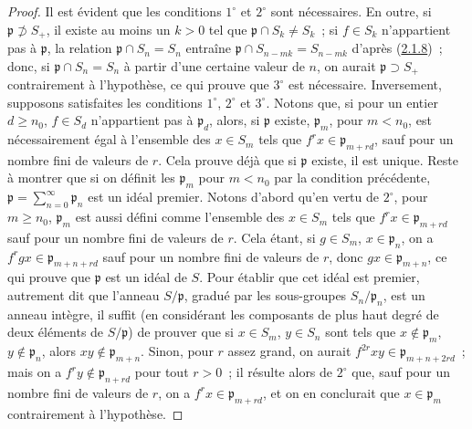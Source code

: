 \begin{proof}
Il est évident que les conditions $1^\circ$ et $2^\circ$ sont nécessaires.
En outre, si $\mathfrak{p}\not\supset S_+$, il existe au moins un $k>0$ tel que
$\mathfrak{p}\cap S_k\neq S_k$~; si $f\in S_k$ n'appartient pas à
$\mathfrak{p}$, la relation $\mathfrak{p}\cap S_n=S_n$ entraîne
$\mathfrak{p}\cap S_{n-mk}=S_{n-mk}$ d'après
(\hyperref[II.2.1.8-fr]{2.1.8})~; donc, si
$\mathfrak{p}\cap S_n=S_n$ à partir d'une certaine valeur de $n$, on aurait
$\mathfrak{p}\supset S_+$ contrairement à l'hypothèse, ce qui prouve que
$3^\circ$ est nécessaire. Inversement, supposons satisfaites les conditions
$1^\circ$, $2^\circ$ et $3^\circ$. Notons que, si pour un entier
$d\geq n_0$, $f\in S_d$ n'appartient pas à $\mathfrak{p}_d$, alors, si
$\mathfrak{p}$ existe, $\mathfrak{p}_m$, pour $m<n_0$, est nécessairement
égal à l'ensemble des $x\in S_m$ tels que
$f^rx\in\mathfrak{p}_{m+rd}$, sauf pour un nombre fini de valeurs de $r$.
Cela prouve déjà que si $\mathfrak{p}$ existe, il est unique. Reste à montrer
que si on définit les $\mathfrak{p}_m$ pour $m<n_0$ par la condition
précédente, $\mathfrak{p}=\sum_{n=0}^{\infty}\mathfrak{p}_n$ est un idéal
premier. Notons d'abord qu'en vertu de $2^\circ$, pour $m\geq n_0$,
$\mathfrak{p}_m$ est aussi défini comme l'ensemble des $x\in S_m$ tels que
$f^rx\in\mathfrak{p}_{m+rd}$ sauf pour un nombre fini de valeurs de $r$.
Cela
étant, si $g\in S_m$, $x\in\mathfrak{p}_n$, on a
$f^rgx\in\mathfrak{p}_{m+n+rd}$ sauf pour un nombre fini de valeurs de $r$,
donc $gx\in\mathfrak{p}_{m+n}$, ce qui prouve que $\mathfrak{p}$ est un
idéal de $S$. Pour établir que cet idéal est premier, autrement dit que
l'anneau $S/\mathfrak{p}$, gradué par les sous-groupes
$S_n/\mathfrak{p}_n$, est un anneau intègre, il suffit (en considérant les
composants de plus haut degré de deux éléments de $S/\mathfrak{p}$) de
prouver que si $x\in S_m$, $y\in S_n$ sont tels que
$x\notin\mathfrak{p}_m$, $y\notin\mathfrak{p}_n$, alors
$xy\notin\mathfrak{p}_{m+n}$. Sinon, pour $r$ assez grand, on aurait
$f^{2r}xy\in\mathfrak{p}_{m+n+2rd}$~; mais on a
$f^ry\notin\mathfrak{p}_{n+rd}$ pour tout $r>0$~; il résulte alors de
$2^\circ$ que, sauf pour un nombre fini de valeurs de $r$, on a
$f^rx\in\mathfrak{p}_{m+rd}$, et on en conclurait que
$x\in\mathfrak{p}_m$ contrairement à l'hypothèse.
\end{proof}

